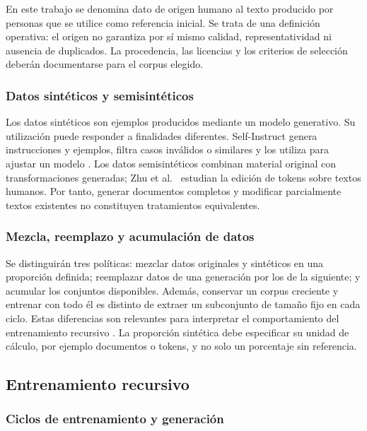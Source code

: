 \documentclass[12pt,letterpaper]{article}
\begin{document}
En este trabajo se denomina dato de origen humano al texto producido por
personas que se utilice como referencia inicial. Se trata de una definición
operativa: el origen no garantiza por sí mismo calidad, representatividad
ni ausencia de duplicados. La procedencia, las licencias y los criterios
de selección deberán documentarse para el corpus elegido.

\subsubsection{Datos sintéticos y semisintéticos}

Los datos sintéticos son ejemplos producidos mediante un modelo generativo.
Su utilización puede responder a finalidades diferentes. Self-Instruct
genera instrucciones y ejemplos, filtra casos inválidos o similares y los
utiliza para ajustar un modelo \cite{wang2023selfinstruct}. Los datos
semisintéticos combinan material original con transformaciones generadas;
Zhu et al.\ \cite{zhu2025} estudian la edición de tokens sobre textos humanos.
Por tanto, generar documentos completos y modificar parcialmente textos
existentes no constituyen tratamientos equivalentes.

\subsubsection{Mezcla, reemplazo y acumulación de datos}

Se distinguirán tres políticas: mezclar datos originales y sintéticos en
una proporción definida; reemplazar datos de una generación por los de la
siguiente; y acumular los conjuntos disponibles. Además, conservar un corpus
creciente y entrenar con todo él es distinto de extraer un subconjunto de
tamaño fijo en cada ciclo. Estas diferencias son relevantes para interpretar
el comportamiento del entrenamiento recursivo \cite{kazdan2025}. La
proporción sintética debe especificar su unidad de cálculo, por ejemplo
documentos o tokens, y no solo un porcentaje sin referencia.

\subsection{Entrenamiento recursivo}

\subsubsection{Ciclos de entrenamiento y generación}
\end{document}
